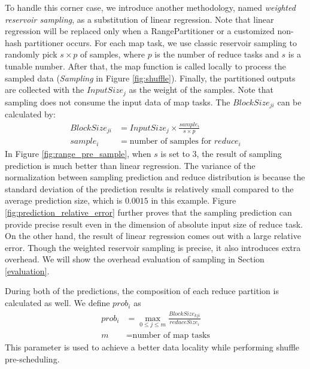 To handle this corner case, we introduce another methodology, named \emph{weighted reservoir sampling}, as a substitution of linear regression. 
Note that linear regression will be replaced only when a RangePartitioner or a customized non-hash partitioner occurs. 
For each map task, we use classic reservoir sampling to randomly pick $s \times p$ of samples, where $p$ is the number of reduce tasks and $s$ is a tunable number. 
After that, the map function is called locally to process the sampled data (\textit{Sampling} in Figure \ref{fig:shuffle}). 
Finally, the partitioned outputs are collected with the $InputSize_j$ as the weight of the samples.
Note that sampling does not consume the input data of map tasks. 
The $BlockSize_{ji}$ can be calculated by:
\begin{equation}
\label{equationsample}
\begin{aligned}
	BlockSize_{ji} &= {{InputSize_j \times \frac{sample_i}{s \times p}}} \\
	sample_i &= \text{number of samples for $reduce_i$}
\end{aligned}
\end{equation}
In Figure \ref{fig:range_pre_sample}, when $s$ is set to $3$, the result of sampling prediction is much better than linear regression. 
The variance of the normalization between sampling prediction and reduce distribution is because the standard deviation of the prediction results is relatively small compared to the average prediction size, which is $0.0015$ in this example. 
Figure \ref{fig:prediction_relative_error} further proves that the sampling prediction can provide precise result even in the dimension of absolute input size of reduce task. 
On the other hand, the result of linear regression comes out with a large relative error. 
Though the weighted reservoir sampling is precise, it also introduces extra overhead. 
We will show the overhead evaluation of sampling in Section \ref{evaluation}.

During both of the predictions, the composition of each reduce partition is calculated as well. We define $prob_i$ as
\begin{equation}
\label{equationprob}
\begin{aligned}
	prob_i &= \max_{0 \leq j \leq m} \frac{BlockSize_{kji}}{reduceSize_i} \\
    m &= \text{number of map tasks}
\end{aligned}
\end{equation}
This parameter is used to achieve a better data locality while performing shuffle pre-scheduling. 


